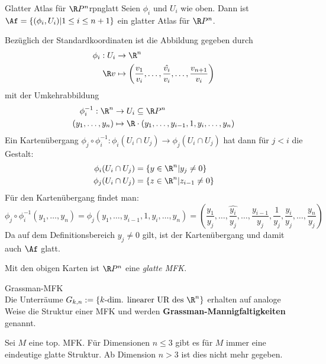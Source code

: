 \begin{satz}{Glatter Atlas für $\R P^n$}{rpnglatt}
Seien $\phi_i$ und $U_i$ wie oben. Dann ist $\Af = \{ (\phi_i, U_i) | 1 \leq i \leq n+1 \}$ ein glatter Atlas für $\R P^n$.
\end{satz}
\begin{beweis}
Bezüglich der Standardkoordinaten ist die Abbildung gegeben durch
\begin{align}
\phi_i : U_i & \to \R^n \\
\R v & \mapsto \left( \frac{v_1}{v_i}, \dots, \hat{\frac{v_i}{v_i}}, \dots, \frac{v_{n+1}}{v_i}\right)
\end{align}
mit der Umkehrabbildung
\begin{align}
\phi_i^{-1}: \R^n &\to U_i \sub \R P^n \\
(y_1, \dots, y_n) &\mapsto \R \cdot (y_1, \dots, y_{i-1}, 1, y_i, \dots, y_n)
\end{align}
Ein Kartenübergang $\phi_j \circ \phi_i ^{-1} : \phi_i (U_i \cap U_j) \to \phi_j (U_i \cap U_j)$ hat dann für $j < i$ die Gestalt:
\begin{align}
\phi_i (U_i \cap U_j) &= \{ y \in \R^n | y_j \neq 0 \} \\
\phi_j (U_i \cap U_j) &= \{z \in \R^n | z_{i-1} \neq 0 \}
\end{align}
Für den Kartenübergang findet man:
\begin{equation}
\phi_j \circ \phi_i^{-1} (y_1, \dots, y_n) = \phi_j (y_1, \dots, y_{i-1}, 1, y_i, \dots, y_n) = \left(\frac{y_1}{y_j}, \dots, \hat{\frac{y_i}{y_j}},\dots, \frac{y_{i-1}}{y_j}, \frac{1}{y_j}, \frac{y_{i}}{y_j}, \dots, \frac{y_{n}}{y_j} \right)
\end{equation}
Da auf dem Definitionsbereich $y_j \neq 0$ gilt, ist der Kartenübergang und damit auch $\Af$ glatt.
\end{beweis}
\begin{korollar}{}{}
Mit den obigen Karten ist $\R P^n$ eine \textit{glatte MFK}.
\end{korollar}
\begin{bemerkung}Grassman-MFK\\
Die Unterräume $G_{k, n} := \{ k \text{-dim. linearer UR des} \ \R^n \}$ erhalten auf analoge Weise die Struktur einer MFK und werden \textbf{Grassman-Mannigfaltigkeiten} genannt.
\end{bemerkung}
Sei $M$ eine top. MFK. Für Dimensionen $n \leq 3$ gibt es für $M$ immer eine eindeutige glatte Struktur. Ab Dimension $n > 3$ ist dies nicht mehr gegeben.
